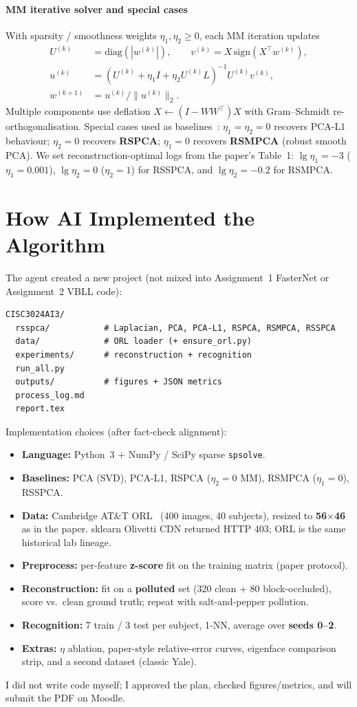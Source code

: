 \documentclass[11pt,a4paper]{article}
\begin{document}
\paragraph{MM iterative solver and special cases}
With sparsity / smoothness weights $\eta_1,\eta_2\ge 0$, each MM iteration updates
\begin{align}
U^{(k)}&=\mathrm{diag}(|w^{(k)}|),
\qquad
v^{(k)}=X\,\mathrm{sign}(X^\top w^{(k)}), \\
u^{(k)}&=(U^{(k)}+\eta_1 I+\eta_2 U^{(k)}L)^{-1} U^{(k)} v^{(k)}, \\
w^{(k+1)}&=u^{(k)}/\|u^{(k)}\|_2.
\end{align}
Multiple components use deflation $X\leftarrow (I-WW^\top)X$ with Gram--Schmidt re-orthogonalisation.
Special cases used as baselines~\cite{wang2025rsspca}: $\eta_1=\eta_2=0$ recovers PCA-L1 behaviour; $\eta_2=0$ recovers \textbf{RSPCA}; $\eta_1=0$ recovers \textbf{RSMPCA} (robust smooth PCA).
We set reconstruction-optimal logs from the paper's Table~1: $\lg\eta_1=-3$ ($\eta_1=0.001$), $\lg\eta_2=0$ ($\eta_2=1$) for RSSPCA, and $\lg\eta_2=-0.2$ for RSMPCA.

\section{How AI Implemented the Algorithm}
The agent created a new project (not mixed into Assignment~1 FasterNet or Assignment~2 VBLL code):
\begin{verbatim}
CISC3024AI3/
  rsspca/           # Laplacian, PCA, PCA-L1, RSPCA, RSMPCA, RSSPCA
  data/             # ORL loader (+ ensure_orl.py)
  experiments/      # reconstruction + recognition
  run_all.py
  outputs/          # figures + JSON metrics
  process_log.md
  report.tex
\end{verbatim}
Implementation choices (after fact-check alignment):
\begin{itemize}
  \item \textbf{Language:} Python~3 + NumPy / SciPy sparse \texttt{spsolve}.
  \item \textbf{Baselines:} PCA (SVD), PCA-L1, RSPCA ($\eta_2{=}0$ MM), RSMPCA ($\eta_1{=}0$), RSSPCA.
  \item \textbf{Data:} Cambridge AT\&T ORL~\cite{samaria1994orl} (400 images, 40 subjects), resized to \textbf{56$\times$46} as in the paper.
        sklearn Olivetti CDN returned HTTP 403; ORL is the same historical lab lineage.
  \item \textbf{Preprocess:} per-feature \textbf{z-score} fit on the training matrix (paper protocol).
  \item \textbf{Reconstruction:} fit on a \textbf{polluted} set (320 clean + 80 block-occluded), score vs.\ clean ground truth; repeat with salt-and-pepper pollution.
  \item \textbf{Recognition:} 7 train / 3 test per subject, 1-NN, average over \textbf{seeds 0--2}.
  \item \textbf{Extras:} $\eta$ ablation, paper-style relative-error curves, eigenface comparison strip, and a second dataset (classic Yale).
\end{itemize}
I did not write code myself; I approved the plan, checked figures/metrics, and will submit the PDF on Moodle.
\end{document}

